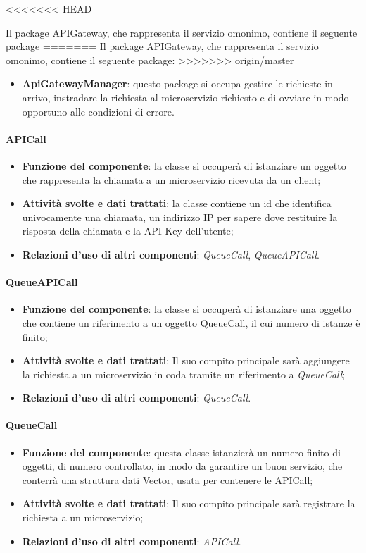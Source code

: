 <<<<<<< HEAD

Il package APIGateway, che rappresenta il servizio omonimo, contiene il seguente package
=======
Il package APIGateway, che rappresenta il servizio omonimo, contiene il seguente package:
>>>>>>> origin/master
\begin{itemize}
	\item \textbf{ApiGatewayManager}: questo package si occupa gestire le richieste in arrivo, instradare la richiesta al microservizio richiesto e di ovviare in modo opportuno alle condizioni di errore.
\end{itemize}

\paragraph{APICall}
\begin{itemize}
	\item \textbf{Funzione del componente}: la classe si occuper\`{a} di istanziare un oggetto che rappresenta la chiamata a un microservizio ricevuta da un client;
	\item \textbf{Attivit\`{a} svolte e dati trattati}: la classe contiene un id che identifica univocamente una chiamata, un indirizzo IP per sapere dove restituire la risposta della chiamata e la API Key dell'utente;
	\item \textbf{Relazioni d'uso di altri componenti}: \textit{QueueCall}, \textit{QueueAPICall}.
\end{itemize}

\paragraph{QueueAPICall}
\begin{itemize}
	\item \textbf{Funzione del componente}: la classe si occuper\`{a} di istanziare una oggetto che contiene un riferimento a un oggetto QueueCall, il cui numero di istanze \`{e} finito;
	\item \textbf{Attivit\`{a} svolte e dati trattati}:  Il suo compito principale sar\`{a} aggiungere la richiesta a un microservizio in coda tramite un riferimento a \textit{QueueCall};
	\item \textbf{Relazioni d'uso di altri componenti}: \textit{QueueCall}.
\end{itemize}

\paragraph{QueueCall}
\begin{itemize}
	\item \textbf{Funzione del componente}: questa classe istanzier\`{a} un numero finito di oggetti, di numero controllato, in modo da garantire un buon servizio, che conterr\`{a} una struttura dati Vector, usata per contenere le APICall;
	\item \textbf{Attivit\`{a} svolte e dati trattati}:  Il suo compito principale sar\`{a} registrare la richiesta a un microservizio;
	\item \textbf{Relazioni d'uso di altri componenti}: \textit{APICall}.
\end{itemize}

